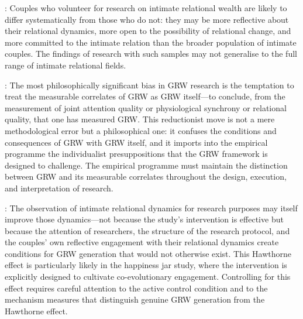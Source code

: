 : Couples who volunteer for research on intimate relational wealth are likely to differ systematically from those who do not: they may be more reflective about their relational dynamics, more open to the possibility of relational change, and more committed to the intimate relation than the broader population of intimate couples. The findings of research with such samples may not generalise to the full range of intimate relational fields.

: The most philosophically significant bias in GRW research is the temptation to treat the measurable correlates of GRW as GRW itself---to conclude, from the measurement of joint attention quality or physiological synchrony or relational quality, that one has measured GRW. This reductionist move is not a mere methodological error but a philosophical one: it confuses the conditions and consequences of GRW with GRW itself, and it imports into the empirical programme the individualist presuppositions that the GRW framework is designed to challenge. The empirical programme must maintain the distinction between GRW and its measurable correlates throughout the design, execution, and interpretation of research.

: The observation of intimate relational dynamics for research purposes may itself improve those dynamics---not because the study's intervention is effective but because the attention of researchers, the structure of the research protocol, and the couples' own reflective engagement with their relational dynamics create conditions for GRW generation that would not otherwise exist. This Hawthorne effect is particularly likely in the happiness jar study, where the intervention is explicitly designed to cultivate co-evolutionary engagement. Controlling for this effect requires careful attention to the active control condition and to the mechanism measures that distinguish genuine GRW generation from the Hawthorne effect.
